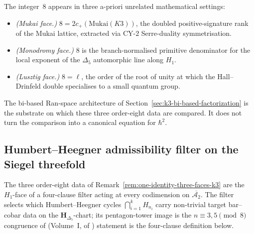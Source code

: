 \begin{remark}
\label{rem:one-identity-three-faces-k3}
The integer~$8$ appears in three a-priori unrelated mathematical settings:
\begin{itemize}
\item \emph{(Mukai face.)} $8 = 2c_+(\mathrm{Mukai}(K3))$, the doubled positive-signature rank of the Mukai lattice, extracted via CY-$2$ Serre-duality symmetrisation.
\item \emph{(Monodromy face.)} $8$ is the branch-normalised primitive denominator for the local exponent of the $\Delta_5$ automorphic line along $H_1$.
\item \emph{(Lusztig face.)} $8 = \ell$, the order of the root of unity at which the Hall--Drinfeld double specialises to a small quantum group.
\end{itemize}
The bi-based Ran-space architecture of Section~\ref{sec:k3-bi-based-factorization} is the substrate on which these three order-eight data are compared. It does not turn the comparison into a canonical equation for $\hbar^2$.
\end{remark}

\subsection{Humbert--Heegner admissibility filter on the Siegel
threefold}
\label{subsec:hh-admissibility-siegel-threefold}

The three order-eight data of Remark~\ref{rem:one-identity-three-faces-k3} are the $H_1$-face of
a four-clause filter acting at every codimension on
$\overline{\mathcal{A}_2}$. The filter selects which Humbert--Heegner
cycles $\bigcap_{i=1}^k H_{n_i}$ carry non-trivial target bar--cobar data
on the $\mathbf{H}_{\Delta_5}$-chart; its pentagon-tower image is the
$n\equiv 3,5\pmod 8$ congruence of
\cite{VolI} (Volume~I,
of \cite{VolI})
statement is the four-clause definition below.

